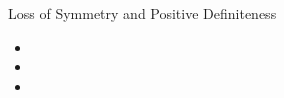 \begin{frame}
Loss of Symmetry and Positive Definiteness
 \begin{itemize}
 \item
 \item
 \item
\end{itemize}
\end{frame}
